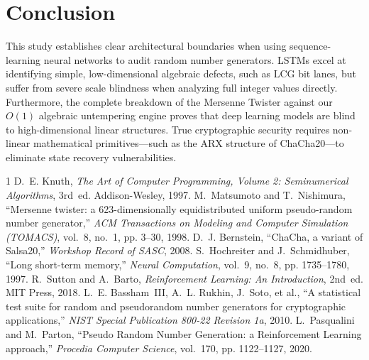 \documentclass[twocolumn,10pt]{article}
\begin{document}
\section{Conclusion}
This study establishes clear architectural boundaries when using sequence-learning neural networks to audit random number generators. LSTMs excel at identifying simple, low-dimensional algebraic defects, such as LCG bit lanes, but suffer from severe scale blindness when analyzing full integer values directly. Furthermore, the complete breakdown of the Mersenne Twister against our $O(1)$ algebraic untempering engine proves that deep learning models are blind to high-dimensional linear structures. True cryptographic security requires non-linear mathematical primitives---such as the ARX structure of ChaCha20---to eliminate state recovery vulnerabilities.

\begin{thebibliography}{1}
D.~E. Knuth, \emph{The Art of Computer Programming, Volume 2: Seminumerical Algorithms}, 3rd~ed. Addison-Wesley, 1997.
M.~Matsumoto and T.~Nishimura, ``Mersenne twister: a 623-dimensionally equidistributed uniform pseudo-random number generator,'' \emph{ACM Transactions on Modeling and Computer Simulation (TOMACS)}, vol.~8, no.~1, pp. 3--30, 1998.
D.~J. Bernstein, ``ChaCha, a variant of Salsa20,'' \emph{Workshop Record of SASC}, 2008.
S.~Hochreiter and J.~Schmidhuber, ``Long short-term memory,'' \emph{Neural Computation}, vol.~9, no.~8, pp. 1735--1780, 1997.
R.~Sutton and A.~Barto, \emph{Reinforcement Learning: An Introduction}, 2nd~ed. MIT Press, 2018.
L.~E. Bassham~III, A.~L. Rukhin, J.~Soto, et al., ``A statistical test suite for random and pseudorandom number generators for cryptographic applications,'' \emph{NIST Special Publication 800-22 Revision 1a}, 2010.
L.~Pasqualini and M.~Parton, ``Pseudo Random Number Generation: a Reinforcement Learning approach,'' \emph{Procedia Computer Science}, vol.~170, pp. 1122--1127, 2020.
\end{thebibliography}
\end{document}
